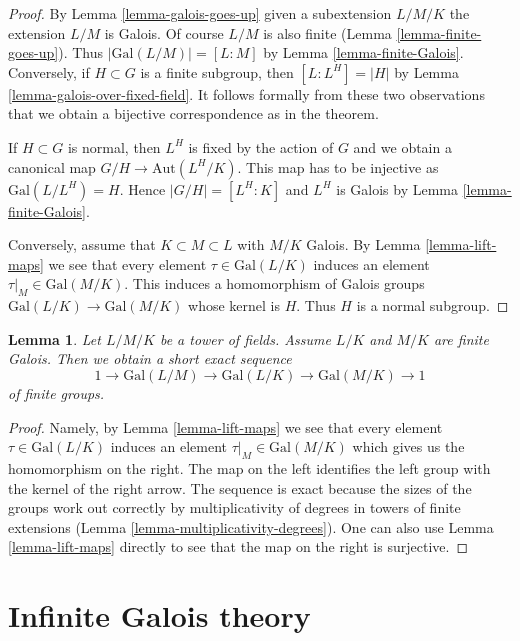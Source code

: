 \documentclass{stacks-project}
\theoremstyle{plain}
\newtheorem{lemma}[subsection]{Lemma}
\theoremstyle{definition}
\theoremstyle{remark}
\numberwithin{equation}{subsection}
\begin{document}
\begin{proof}
By Lemma \ref{lemma-galois-goes-up} given a subextension $L/M/K$
the extension $L/M$ is Galois. Of course $L/M$ is also finite
(Lemma \ref{lemma-finite-goes-up}). Thus $|\text{Gal}(L/M)| = [L : M]$
by Lemma \ref{lemma-finite-Galois}.
Conversely, if $H \subset G$ is a finite subgroup, then
$[L : L^H] = |H|$ by Lemma \ref{lemma-galois-over-fixed-field}.
It follows formally from these two observations that we obtain
a bijective correspondence as in the theorem.

\medskip\noindent
If $H \subset G$ is normal, then $L^H$ is fixed by the action of
$G$ and we obtain a canonical map $G/H \to \text{Aut}(L^H/K)$.
This map has to be injective as $\text{Gal}(L/L^H) = H$. Hence
$|G/H| = [L^H : K]$ and $L^H$ is Galois by
Lemma \ref{lemma-finite-Galois}.

\medskip\noindent
Conversely, assume that $K \subset M \subset L$ with $M/K$ Galois.
By Lemma \ref{lemma-lift-maps} we see that every
element $\tau \in \text{Gal}(L/K)$ induces an element
$\tau|_M \in \text{Gal}(M/K)$. This induces a homomorphism
of Galois groups $\text{Gal}(L/K) \to \text{Gal}(M/K)$ whose
kernel is $H$. Thus $H$ is a normal subgroup.
\end{proof}

\begin{lemma}
\label{lemma-ses-galois}
Let $L/M/K$ be a tower of fields. Assume $L/K$ and $M/K$ are finite Galois.
Then we obtain a short exact sequence
$$
1 \to \text{Gal}(L/M) \to \text{Gal}(L/K) \to \text{Gal}(M/K) \to 1
$$
of finite groups.
\end{lemma}

\begin{proof}
Namely, by Lemma \ref{lemma-lift-maps}
we see that every element $\tau \in \text{Gal}(L/K)$ induces an element
$\tau|_M \in \text{Gal}(M/K)$ which gives us the homomorphism on the
right. The map on the left identifies the left group with the kernel
of the right arrow. The sequence is exact because the sizes
of the groups work out correctly by multiplicativity of degrees
in towers of finite extensions
(Lemma \ref{lemma-multiplicativity-degrees}).
One can also use Lemma \ref{lemma-lift-maps}
directly to see that the map on the right is surjective.
\end{proof}






\section{Infinite Galois theory}
\label{section-infinite-galois}
\end{document}
